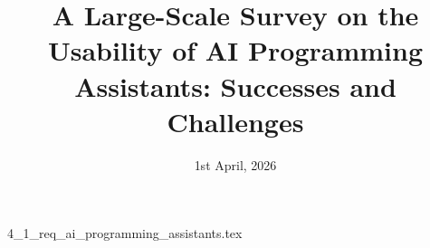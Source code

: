 \documentclass{article}      %
\title{A Large-Scale Survey on the Usability of AI Programming Assistants: Successes and Challenges}  %
\date{1st April, 2026}
\begin{document}

\maketitle                   %



{4_1_req_ai_programming_assistants.tex}
\printbibliography
\end{document}
